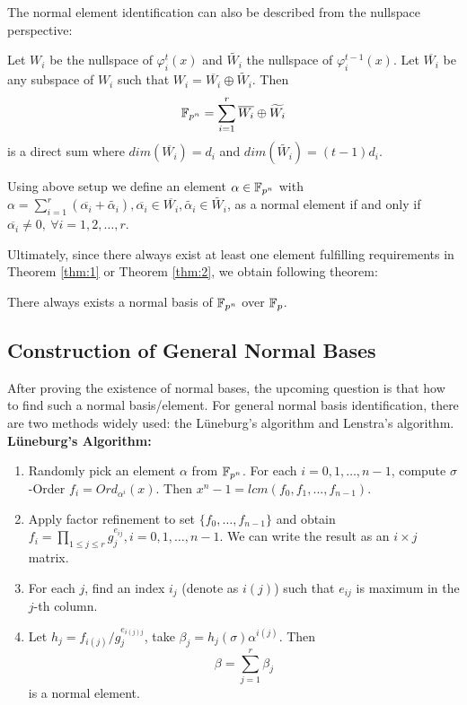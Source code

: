 The normal element identification can also be described from the nullspace perspective:
\begin{Theorem}
\label{thm:2}
Let $W_i$ be the nullspace of $\varphi_{i}^{t} (x)$ and $\widetilde{W_i}$ the
nullspace of $\varphi_{i}^{t-1} (x)$. Let $\overline{W_i}$ be any subspace of
$W_i$ such that $W_i = \overline{W_i}\oplus \widetilde{W_i}$. Then
$${\mathbb{F}}_{p^n} = \displaystyle\sum_{i=1}^{r} \overline{W_i}\oplus \widetilde{W_i}$$
is a direct sum where $dim(\overline{W_i}) = d_i$ and $dim(\widetilde{W_i}) = (t-1)d_i$.

Using above setup we define an element $\alpha \in {\mathbb{F}}_{p^n}$ with 
$\alpha = \sum_{i=1}^{r} (\overline{\alpha_i} + \widetilde{\alpha_i}), \overline{\alpha_i} \in \overline{W_i}, \widetilde{\alpha_i} \in \widetilde{W_i}$,
as a normal element if and only if $\overline{\alpha_i} \neq 0,~ \forall i = 1,2,\dots,r$.
\end{Theorem}

Ultimately, since there always exist at least one element fulfilling requirements in Theorem \ref{thm:1}
or Theorem \ref{thm:2}, we obtain following theorem:
\begin{Theorem}
There always exists a normal basis of ${\mathbb{F}}_{p^n}$ over ${\mathbb{F}}_p$.
\end{Theorem}
\subsection{Construction of General Normal Bases}
After proving the existence of normal bases, the upcoming question is that how to find such a normal basis/element.
For general normal basis identification, there are two methods widely used: the L\"uneburg's algorithm
and Lenstra's algorithm.\\
\textbf{L\"uneburg's Algorithm:}
\begin{enumerate}[{1)}]
\item Randomly pick an element $\alpha$ from ${\mathbb{F}}_{p^n}$. For each $i = 0,1,\dots,n-1$, 
compute $\sigma$-Order $f_i = Ord_{\alpha^i}(x)$. Then $x^n - 1 = lcm(f_0,f_1,...,f_{n-1})$.
\item Apply factor refinement to set $\{f_0,\dots,f_{n-1}\}$ and obtain $f_i = \prod_{1\leq j\leq r} g_{j}^{e_{ij}}, i = 0,1,\dots,n-1$.
We can write the result as an $i\times j$ matrix.
\item For each $j$, find an index $i_j$ (denote as $i(j)$) such that $e_{ij}$ is maximum in the $j$-th column.
\item Let $h_j = f_{i(j)}/g_{j}^{e_{i(j)j}}$, take $\beta_j = h_j(\sigma)\alpha^{i(j)}$. Then
$$\beta = \displaystyle\sum_{j=1}^{r} \beta_j$$
is a normal element.
\end{enumerate}

